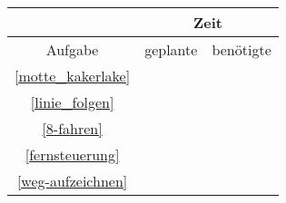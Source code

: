 
\begin{center}
	\begin{tabular}{  c | c | c | }
		\cline{2-3}
		& \multicolumn{2}{|c|}{Zeit}  \\ 
		\hline
		\multicolumn{1}{|c|}{Aufgabe} & geplante & benötigte \\
		\hline
		\hline
		\multicolumn{1}{|c|}{\nameref{motte_kakerlake} \ref{motte_kakerlake}}  &  &  \\ 
		\hline
		\multicolumn{1}{|c|}{\nameref{linie_folgen} \ref{linie_folgen}} &  &  \\ 
		\hline
		\multicolumn{1}{|c|}{\nameref{8-fahren} \ref{8-fahren}} &  &  \\ 
		\hline
		\multicolumn{1}{|c|}{\nameref{fernsteuerung} \ref{fernsteuerung}} &  &  \\ 
		\hline
		\multicolumn{1}{|c|}{\nameref{weg-aufzeichnen} \ref{weg-aufzeichnen}} &  &  \\ 
		\hline
  \end{tabular}
\end{center}
